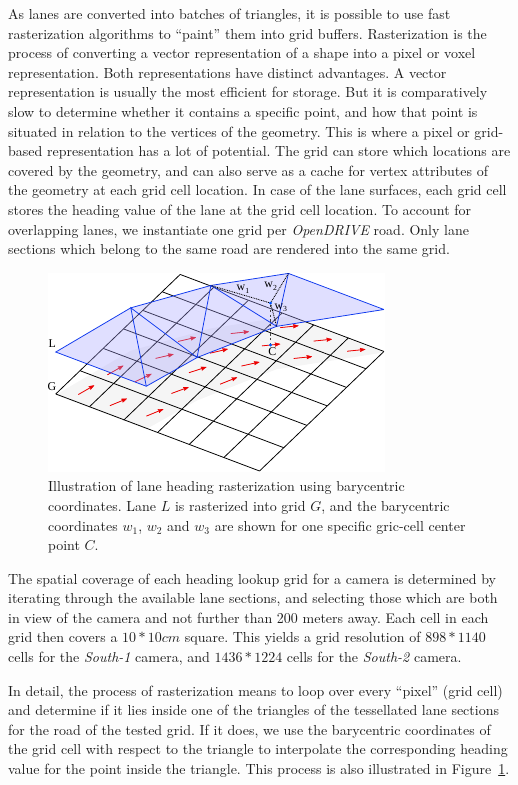 As lanes are converted into batches of triangles, it is possible to use fast rasterization algorithms to \enquote{paint} them into grid buffers.
Rasterization is the process of converting a vector representation of a shape into a pixel or voxel representation.
Both representations have distinct advantages.
A vector representation is usually the most efficient for storage.
But it is comparatively slow to determine whether it contains a specific point, and how that point is situated in relation to the vertices of the geometry.
This is where a pixel or grid-based representation has a lot of potential.
The grid can store which locations are covered by the geometry, and can also serve as a cache for vertex attributes of the geometry at each grid cell location.
In case of the lane surfaces, each grid cell stores the heading value of the lane at the grid cell location.
To account for overlapping lanes, we instantiate one grid per \textit{OpenDRIVE} road.
Only lane sections which belong to the same road are rendered into the same grid.

\begin{figure}[htb]
    \centering
    \includegraphics[width=0.7\linewidth]{figures/rasterization}
    \caption{Illustration of lane heading rasterization using barycentric coordinates. Lane $L$ is rasterized into grid $G$, and the barycentric coordinates $w_1$, $w_2$ and $w_3$ are shown for one specific gric-cell center point $C$.}
    \label{fig:rasterization}
\end{figure}

The spatial coverage of each heading lookup grid for a camera is determined by iterating through the available lane sections, and selecting those which are both in view of the camera and not further than 200 meters away.
Each cell in each grid then covers a $10*10cm$ square.
This yields a grid resolution of $898*1140$ cells for the \textit{South-1} camera, and $1436*1224$ cells for the \textit{South-2} camera.

In detail, the process of rasterization means to loop over every \enquote{pixel} (grid cell) and determine if it lies inside one of the triangles of the tessellated lane sections for the road of the tested grid.
If it does, we use the barycentric coordinates of the grid cell with respect to the triangle to interpolate the corresponding heading value for the point inside the triangle.
This process is also illustrated in Figure~\ref{fig:rasterization}.

